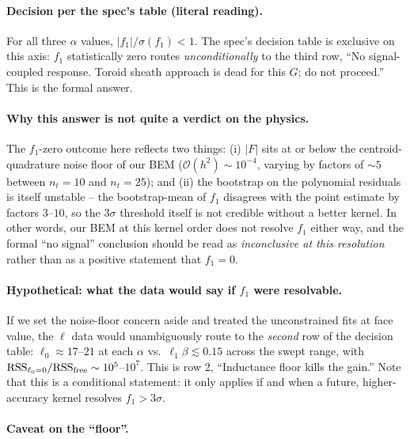 \documentclass[11pt]{article}
\begin{document}
\paragraph{Decision per the spec's table (literal reading).}

For all three $\alpha$ values, $|f_1|/\sigma(f_1)<1$.  The spec's
decision table is exclusive on this axis: $f_1$ statistically zero
routes \emph{unconditionally} to the third row, ``No signal-coupled
response. Toroid sheath approach is dead for this $G$; do not
proceed.''  This is the formal answer.

\paragraph{Why this answer is not quite a verdict on the physics.}

The $f_1$-zero outcome here reflects two things: (i) $|F|$ sits at or
below the centroid-quadrature noise floor of our BEM
($\mathcal O(h^2)\sim 10^{-4}$, varying by factors of $\sim 5$ between
$n_t=10$ and $n_t=25$); and (ii) the bootstrap on the polynomial
residuals is itself unstable -- the bootstrap-mean of $f_1$ disagrees
with the point estimate by factors $3$--$10$, so the $3\sigma$
threshold itself is not credible without a better kernel.  In other
words, our BEM at this kernel order does not resolve $f_1$ either way,
and the formal ``no signal'' conclusion should be read as
\emph{inconclusive at this resolution} rather than as a positive
statement that $f_1=0$.

\paragraph{Hypothetical: what the data would say if $f_1$ were
resolvable.}

If we set the noise-floor concern aside and treated the unconstrained
fits at face value, the $\ell$ data would unambiguously route to the
\emph{second} row of the decision table: $\ell_0\approx 17$--$21$ at
each $\alpha$ vs.\ $\ell_1\beta\lesssim 0.15$ across the swept range,
with $\mathrm{RSS}_{\ell_0=0}/\mathrm{RSS}_{\rm free}\sim 10^5$--$10^7$.
This is row 2, ``Inductance floor kills the gain.''  Note that this is
a conditional statement: it only applies if and when a future,
higher-accuracy kernel resolves $f_1>3\sigma$.

\paragraph{Caveat on the ``floor''.}
\end{document}
